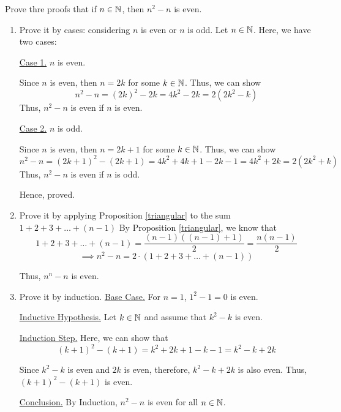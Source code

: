 \bp Prove thre proofs that if $n \in \mathbb{N}$, then $n^2 - n$ is even.
\begin{enumerate}
	\item Prove it by cases: considering $n$ is even or $n$ is odd.
		\bs
		Let $n \in \mathbb{N}$. Here, we have two cases:

		\underline{Case 1.} $n$ is even. 

		Since $n$ is even, then $n = 2k$ for some $k \in \mathbb{N}$. 
		Thus, we can show
		$$n^2 - n = (2k)^2 - 2k = 4k^2 - 2k = 2(2k^2-k)$$
		Thus, $n^2 - n$ is even if $n$ is even.

		\underline{Case 2.} $n$ is odd. 

		Since $n$ is even, then $n = 2k+1$ for some $k \in \mathbb{N}$. 
		Thus, we can show
		$$n^2 - n = (2k+1)^2 - (2k+1) = 4k^2 + 4k + 1 - 2k - 1 = 4k^2 + 2k = 2(2k^2 + k)$$
		Thus, $n^2 - n$ is even if $n$ is odd.

		Hence, proved.
		\es


	\item Prove it by applying Proposition \ref{triangular} to the sum $1 + 2 + 3 + \ldots + (n-1)$
		\bs
		By Proposition \ref{triangular}, we know that 
		$$1 + 2 + 3 + \ldots + (n-1) = \frac{(n-1)((n-1)+1)}{2} = \frac{n(n-1)}{2}$$
		$$\implies n^2 - n = 2 \cdot (1 + 2 + 3 + \ldots + (n-1))$$

		Thus, $n^n - n$ is even.
		\es
		
	\item Prove it by induction.
		\bs
		\underline{Base Case.} For $n = 1$, $1^2 - 1 = 0$ is even.

		\underline{Inductive Hypothesis.} Let $k \in \mathbb{N}$ and assume that $k^2 - k$ is even.

		\underline{Induction Step.} Here, we can show that 
		$$(k+1)^2 - (k+1) = k^2 + 2k + 1 - k - 1 = k^2 - k + 2k$$

		Since $k^2 - k$ is even and $2k$ is even, therefore, $k^2 - k + 2k$ is also even.
		Thus, $(k+1)^2 - (k+1)$ is even.

		\underline{Conclusion.} By Induction, $n^2 - n$ is even for all $n \in \mathbb{N}$.
		\es
\end{enumerate}
\ep


